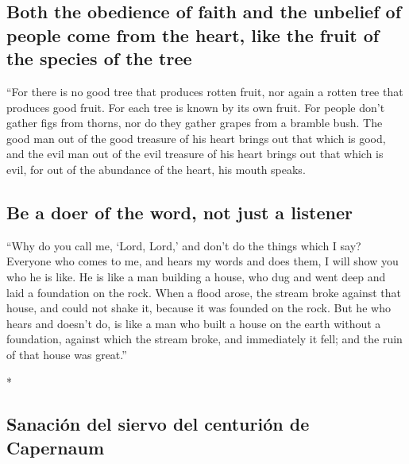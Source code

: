 \begin{paracol}{2}
\begin{otherlanguage}{english}
\hypertarget{both-the-obedience-of-faith-and-the-unbelief-of-people-come-from-the-heart-like-the-fruit-of-the-species-of-the-tree}{%
\subsection{Both the obedience of faith and the unbelief of people come
from the heart, like the fruit of the species of the
tree}\label{both-the-obedience-of-faith-and-the-unbelief-of-people-come-from-the-heart-like-the-fruit-of-the-species-of-the-tree}}

 ``For there is no good tree that produces rotten fruit,
nor again a rotten tree that produces good fruit.  For
each tree is known by its own fruit. For people don't gather figs from
thorns, nor do they gather grapes from a bramble bush. 
The good man out of the good treasure of his heart brings out that which
is good, and the evil man out of the evil treasure of his heart brings
out that which is evil, for out of the abundance of the heart, his mouth
speaks.

\hypertarget{be-a-doer-of-the-word-not-just-a-listener}{%
\subsection{Be a doer of the word, not just a
listener}\label{be-a-doer-of-the-word-not-just-a-listener}}

 ``Why do you call me, `Lord, Lord,' and don't do the
things which I say?  Everyone who comes to me, and hears
my words and does them, I will show you who he is like. 
He is like a man building a house, who dug and went deep and laid a
foundation on the rock. When a flood arose, the stream broke against
that house, and could not shake it, because it was founded on the rock.
 But he who hears and doesn't do, is like a man who built
a house on the earth without a foundation, against which the stream
broke, and immediately it fell; and the ruin of that house was great.''

\end{otherlanguage}

\switchcolumn[0]*

\hypertarget{sanaciuxf3n-del-siervo-del-centuriuxf3n-de-capernaum}{%
\subsection{Sanación del siervo del centurión de
Capernaum}\label{sanaciuxf3n-del-siervo-del-centuriuxf3n-de-capernaum}}


\end{paracol}
